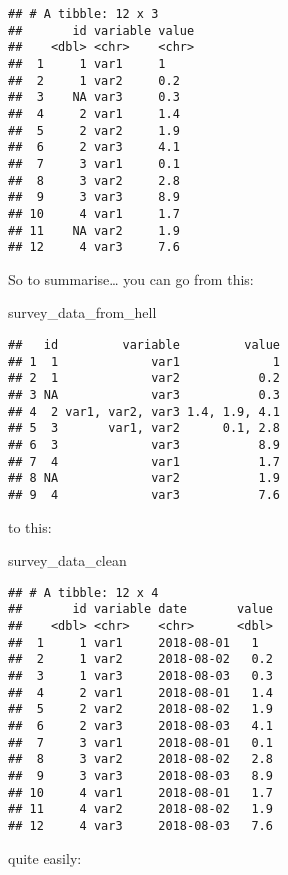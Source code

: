\documentclass[
]{article}
\newenvironment{Shaded}{\begin{snugshade}}{\end{snugshade}}
\newcommand{\NormalTok}[1]{#1}
\begin{document}
\begin{verbatim}
## # A tibble: 12 x 3
##       id variable value
##    <dbl> <chr>    <chr>
##  1     1 var1     1    
##  2     1 var2     0.2  
##  3    NA var3     0.3  
##  4     2 var1     1.4  
##  5     2 var2     1.9  
##  6     2 var3     4.1  
##  7     3 var1     0.1  
##  8     3 var2     2.8  
##  9     3 var3     8.9  
## 10     4 var1     1.7  
## 11    NA var2     1.9  
## 12     4 var3     7.6
\end{verbatim}

So to summarise\ldots{} you can go from this:

\begin{Shaded}
\begin{Highlighting}[]
\NormalTok{survey\_data\_from\_hell}
\end{Highlighting}
\end{Shaded}

\begin{verbatim}
##   id         variable         value
## 1  1             var1             1
## 2  1             var2           0.2
## 3 NA             var3           0.3
## 4  2 var1, var2, var3 1.4, 1.9, 4.1
## 5  3       var1, var2      0.1, 2.8
## 6  3             var3           8.9
## 7  4             var1           1.7
## 8 NA             var2           1.9
## 9  4             var3           7.6
\end{verbatim}

to this:

\begin{Shaded}
\begin{Highlighting}[]
\NormalTok{survey\_data\_clean}
\end{Highlighting}
\end{Shaded}

\begin{verbatim}
## # A tibble: 12 x 4
##       id variable date       value
##    <dbl> <chr>    <chr>      <dbl>
##  1     1 var1     2018-08-01   1  
##  2     1 var2     2018-08-02   0.2
##  3     1 var3     2018-08-03   0.3
##  4     2 var1     2018-08-01   1.4
##  5     2 var2     2018-08-02   1.9
##  6     2 var3     2018-08-03   4.1
##  7     3 var1     2018-08-01   0.1
##  8     3 var2     2018-08-02   2.8
##  9     3 var3     2018-08-03   8.9
## 10     4 var1     2018-08-01   1.7
## 11     4 var2     2018-08-02   1.9
## 12     4 var3     2018-08-03   7.6
\end{verbatim}

quite easily:
\end{document}
